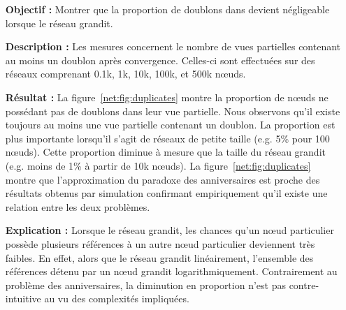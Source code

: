 \begin{itemize}
\item[\textbf{Objectif :}] Montrer que la proportion de doublons dans \SPRAY
  devient négligeable lorsque le réseau grandit.
\item[\textbf{Description :}] Les mesures concernent le nombre de vues
  partielles contenant au moins un doublon après convergence. Celles-ci sont
  effectuées sur des réseaux comprenant 0.1k, 1k, 10k, 100k, et 500k nœuds.
\item[\textbf{Résultat :}] La figure~\ref{net:fig:duplicates} montre la
  proportion de nœuds ne possédant pas de doublons dans leur vue partielle. Nous
  observons qu'il existe toujours au moins une vue partielle contenant un
  doublon. La proportion est plus importante lorsqu'il s'agit de réseaux de
  petite taille (e.g. 5\% pour 100 nœuds). Cette proportion diminue à mesure que
  la taille du réseau grandit (e.g. moins de 1\% à partir de 10k nœuds). La
  figure~\ref{net:fig:duplicates} montre que l'approximation du paradoxe des
  anniversaires est proche des résultats obtenus par simulation confirmant
  empiriquement qu'il existe une relation entre les deux problèmes.
\item[\textbf{Explication :}] Lorsque le réseau grandit, les chances qu'un nœud
  particulier possède plusieurs références à un autre nœud particulier
  deviennent très faibles. En effet, alors que le réseau grandit linéairement,
  l'ensemble des références détenu par un nœud grandit
  logarithmiquement. Contrairement au problème des anniversaires, la diminution
  en proportion n'est pas contre-intuitive au vu des complexités impliquées.
\end{itemize}

